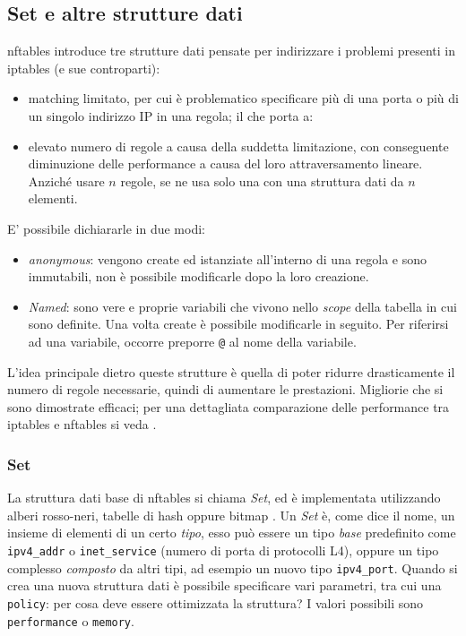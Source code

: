 \subsection{Set e altre strutture dati}
nftables introduce tre strutture dati pensate per indirizzare i problemi
presenti in iptables (e sue controparti):
\begin{itemize}
	\item matching limitato, per cui è problematico specificare più di una porta
	      o più di un singolo indirizzo IP in una regola; il che porta a:
	\item elevato numero di regole a causa della suddetta limitazione, con conseguente
	diminuzione delle performance a causa del loro attraversamento lineare. Anziché usare
	$n$ regole, se ne usa solo una con una struttura dati da $n$ elementi.
\end{itemize}
E' possibile dichiararle in due modi:
\begin{itemize}
	\item \textit{anonymous}: vengono create ed istanziate all'interno di una regola
	      e sono immutabili, non è possibile modificarle dopo la loro creazione.
	\item \textit{Named}: sono vere e proprie variabili che vivono nello \textit{scope}
	      della tabella in cui sono definite. Una volta create è possibile modificarle
	      in seguito. Per riferirsi ad una variabile, occorre preporre \texttt{@} al nome
	      della variabile.
\end{itemize}
L'idea principale dietro queste strutture è quella di poter
ridurre drasticamente il numero di regole necessarie, quindi di aumentare
le prestazioni. Migliorie che si sono
dimostrate efficaci; per una dettagliata comparazione delle performance tra
iptables e nftables si veda \cite{nftables-iptables-thesis}.

\subsubsection{Set}
La struttura dati base di nftables si chiama \textit{Set}, ed è implementata
utilizzando alberi rosso-neri, tabelle di hash oppure bitmap \cite{nftables-sets}.
Un \textit{Set} è, come dice il nome, un insieme di elementi di un certo \textit{tipo},
esso può essere un tipo \textit{base} predefinito come \texttt{ipv4\_addr} o
\texttt{inet\_service} (numero di porta di protocolli L4), oppure un tipo complesso
\textit{composto} da altri tipi, ad esempio un nuovo tipo \texttt{ipv4\_port}.
Quando si crea una nuova struttura dati è possibile specificare vari parametri,
tra cui una \texttt{policy}: per cosa deve essere ottimizzata la struttura?
I valori possibili sono \texttt{performance} o \texttt{memory}.

